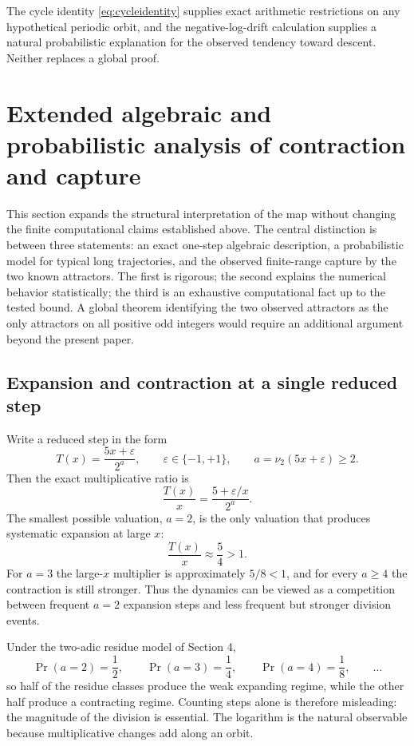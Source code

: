 \documentclass[11pt]{article}
\newcommand{\vTwo}{\nu_2}
\begin{document}
The cycle identity \eqref{eq:cycleidentity} supplies exact arithmetic restrictions on any hypothetical periodic orbit, and the negative-log-drift calculation supplies a natural probabilistic explanation for the observed tendency toward descent. Neither replaces a global proof.


\section{Extended algebraic and probabilistic analysis of contraction and capture}

This section expands the structural interpretation of the map without changing the finite computational claims established above.  The central distinction is between three statements: an exact one-step algebraic description, a probabilistic model for typical long trajectories, and the observed finite-range capture by the two known attractors.  The first is rigorous; the second explains the numerical behavior statistically; the third is an exhaustive computational fact up to the tested bound.  A global theorem identifying the two observed attractors as the only attractors on all positive odd integers would require an additional argument beyond the present paper.

\subsection{Expansion and contraction at a single reduced step}

Write a reduced step in the form
\[
T(x)=\frac{5x+\varepsilon}{2^a},\qquad
\varepsilon\in\{-1,+1\},\qquad a=\vTwo(5x+\varepsilon)\ge2.
\]
Then the exact multiplicative ratio is
\begin{equation}
\frac{T(x)}{x}=\frac{5+\varepsilon/x}{2^a}.
\label{eq:onestepratio}
\end{equation}
The smallest possible valuation, $a=2$, is the only valuation that produces systematic expansion at large $x$:
\[
\frac{T(x)}{x}\approx\frac54>1.
\]
For $a=3$ the large-$x$ multiplier is approximately $5/8<1$, and for every $a\ge4$ the contraction is still stronger.  Thus the dynamics can be viewed as a competition between frequent $a=2$ expansion steps and less frequent but stronger division events.

Under the two-adic residue model of Section 4,
\[
\Pr(a=2)=\frac12,\qquad
\Pr(a=3)=\frac14,\qquad
\Pr(a=4)=\frac18,\qquad\ldots
\]
so half of the residue classes produce the weak expanding regime, while the other half produce a contracting regime.  Counting steps alone is therefore misleading: the magnitude of the division is essential.  The logarithm is the natural observable because multiplicative changes add along an orbit.
\end{document}
